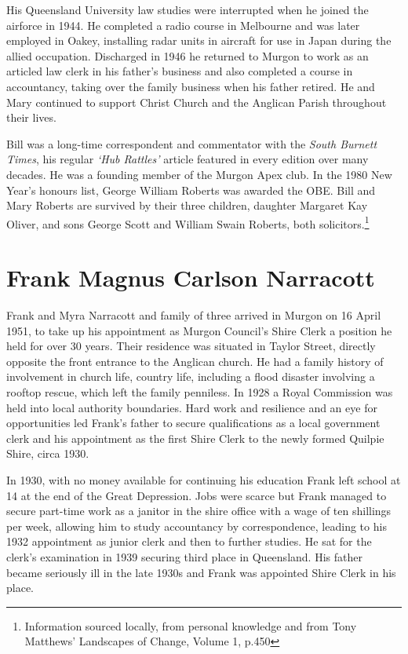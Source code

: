 His Queensland University law studies were interrupted when he joined the airforce in 1944. He completed a radio course in Melbourne and was later employed in Oakey, installing radar units in aircraft for use in Japan during the allied occupation. Discharged in 1946 he returned to Murgon to work as an articled law clerk in his father's business and also completed a course in accountancy, taking over the family business when his father retired. He and Mary continued to support Christ Church and the Anglican Parish throughout their lives.



Bill was a long-time correspondent and commentator with the \emph{South Burnett Times}, his regular \emph{`Hub Rattles'} article featured in every edition over many decades. He was a founding member of the Murgon Apex club. In the 1980 New Year's honours list, George William Roberts was awarded the OBE. Bill and Mary Roberts are survived by their three children, daughter Margaret Kay Oliver, and sons George Scott and William Swain Roberts, both solicitors.\footnote{Information sourced locally, from personal knowledge and from Tony Matthews' Landscapes of Change, Volume 1, p.450}


\section{Frank Magnus Carlson Narracott}



Frank and Myra Narracott and family of three arrived in Murgon on 16 April 1951, to take up his appointment as Murgon Council's Shire Clerk a position he held for over 30 years. Their residence was situated in Taylor Street, directly opposite the front entrance to the Anglican church. He had a family history of involvement in church life, country life, including a flood disaster involving a rooftop rescue, which left the family penniless. In 1928 a Royal Commission was held into local authority boundaries. Hard work and resilience and an eye for opportunities led Frank's father to secure qualifications as a local government clerk and his appointment as the first Shire Clerk to the newly formed Quilpie Shire, circa 1930.



In 1930, with no money available for continuing his education Frank left school at 14 at the end of the Great Depression. Jobs were scarce but Frank managed to secure part-time work as a janitor in the shire office with a wage of ten shillings per week, allowing him to study accountancy by correspondence, leading to his 1932 appointment as junior clerk and then to further studies. He sat for the clerk's examination in 1939 securing third place in Queensland. His father became seriously ill in the late 1930s and Frank was appointed Shire Clerk in his place.



